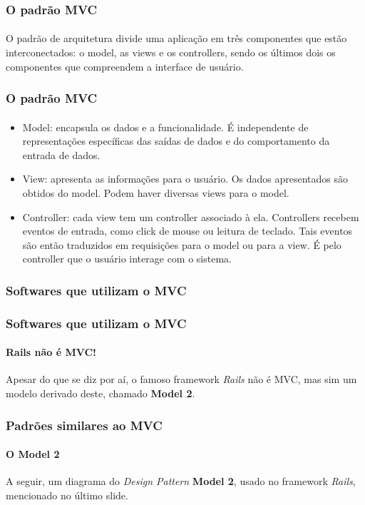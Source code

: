 \documentclass{beamer}
\begin{document}
\begin{frame}
\frametitle{O padrão MVC}
\framesubtitle{}
	O padrão de arquitetura divide uma aplicação em três componentes que estão interconectados: o model, as views e os controllers, sendo os últimos dois os componentes que compreendem a interface de usuário.
\end{frame}

\begin{frame}
\frametitle{O padrão MVC}
\framesubtitle{}
\begin{itemize}
	\item Model: encapsula os dados e a funcionalidade. É independente de representações específicas das saídas de dados e do comportamento da entrada de dados.
	\item View: apresenta as informações para o usuário. Os dados apresentados são obtidos do model. Podem haver diversas views para o model.
	\item Controller: cada view tem um controller associado à ela. Controllers recebem eventos de entrada, como click de mouse ou leitura de teclado. Tais eventos são então traduzidos em requisições para o model ou para a view. É pelo controller que o usuário interage com o sistema.
\end{itemize}
\end{frame}

\begin{frame}
\frametitle{Softwares que utilizam o MVC}
\framesubtitle{}
\end{frame}

\begin{frame}
\frametitle{Softwares que utilizam o MVC}
\framesubtitle{Rails não é MVC!}
	Apesar do que se diz por aí, o famoso framework \textit{Rails} não é MVC, mas sim um modelo derivado deste, chamado \textbf{Model 2}. 
\end{frame}
\begin{frame}
\frametitle{Padrões similares ao MVC}
\framesubtitle{O Model 2}
	A seguir, um diagrama do \textit{Design Pattern} \textbf{Model 2}, usado no framework \textit{Rails}, mencionado no último slide.
\end{frame}
\end{document}
